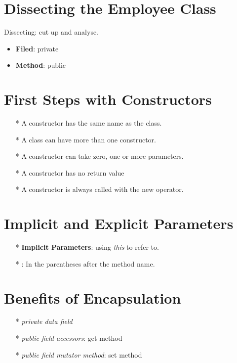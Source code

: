 \documentclass[12pt,a4paper]{article}
\begin{document}
\section{Dissecting the Employee Class}

{\color{orange}Dissecting:} cut up and analyse.\\

\begin{itemize}
	\item \textbf{Filed}: private
	\item \textbf{Method}: public
\end{itemize}

\section{First Steps with Constructors}

\begin{itemize}
	\item [*] A constructor has the same name as the class.
	\item [*] A class can have more than one constructor.
	\item [*] A constructor can take zero, one or more parameters.
	\item [*] A constructor has no return value
	\item [*] A constructor is always called with the new operator.

\end{itemize}

\section{Implicit and Explicit Parameters}

\begin{itemize}
	\item[*] {\color{red}\textbf{Implicit Parameters}}: using \textit{this} to refer to.
	\item[*] {\color{red}{Explicit Parameters}}: In the parentheses after the method name.
\end{itemize}

\section{Benefits of Encapsulation}

\begin{itemize}
	\item[*] {\color{red}\textit{private data field}}
	\item[*] {\color{red}\textit{public field accessors}}: get method
	\item[*] {\color{red}\textit{public field mutator method}}: set method\\
\end{itemize}
\end{document}
